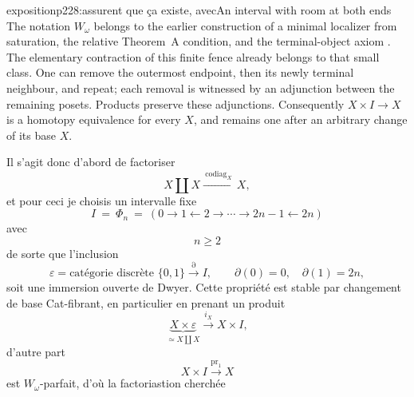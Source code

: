 \begin{dcomment}{exposition}{p228:assurent que ça existe, avec}{An interval with room at both ends}
The notation $W_\omega$ belongs to the earlier construction of a minimal localizer from saturation, the relative Theorem~A condition, and the terminal-object axiom \citep[manuscript p.~14]{Grothendieck1990XIIa}. The elementary contraction of this finite fence already belongs to that small class. One can remove the outermost endpoint, then its newly terminal neighbour, and repeat; each removal is witnessed by an adjunction between the remaining posets. Products preserve these adjunctions. Consequently $X\times I\to X$ is a homotopy equivalence for every $X$, and remains one after an arbitrary change of its base $X$.
\end{dcomment}


Il s'agit donc d'abord de factoriser
\[
X \amalg X \xrightarrow{\ \mathrm{codiag}_X\ } X,
\]
et pour ceci je choisis un intervalle fixe
\[
I \ = \ \Phi_n \ = \ (0 \longrightarrow 1 \longleftarrow 2 \longrightarrow \cdots \longrightarrow 2n-1 \longleftarrow 2n)
\]
avec
\[
n \geq 2
\]
de sorte que l'inclusion
\[
\varepsilon = \text{catégorie discrète } \{0,1\} \xrightarrow{\partial} I, \qquad \partial(0) = 0, \quad \partial(1) = 2n,
\]
soit une immersion ouverte de Dwyer. Cette propriété est stable par changement de base Cat-fibrant, en particulier en prenant un produit
\[
\underbrace{X \times \varepsilon}_{\simeq X \coprod X} \xrightarrow{i_X} X \times I,
\]
\begingroup\renewcommand{\thefootnote}{}\endgroup
{}
d'autre part
\[
X \times I \xrightarrow{\mathrm{pr}_1} X
\]
est $W_\omega$-parfait, d'où la factoriastion cherchée %
